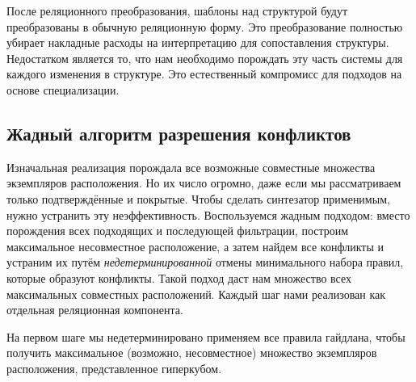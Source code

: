 После реляционного преобразования, шаблоны над структурой будут преобразованы в обычную реляционную форму. Это преобразование
полностью убирает накладные расходы на интерпретацию для сопоставления структуры. Недостатком является то, что нам необходимо
порождать эту часть системы для каждого изменения в структуре. Это естественный компромисс для подходов на основе специализации.


\subsection{Жадный алгоритм разрешения конфликтов }

Изначальная реализация порождала все возможные совместные множества экземпляров расположения.
Но их число огромно, даже если мы рассматриваем только подтверждённые и покрытые.
Чтобы сделать синтезатор применимым, нужно устранить эту неэффективность. Воспользуемся жадным подходом:
вместо порождения всех подходящих и последующей фильтрации, построим максимальное несовместное расположение, а затем найдем
все конфликты и устраним их путём \emph{недетерминированной} отмены минимального набора правил, которые образуют конфликты.
Такой подход даст нам множество всех максимальных совместных расположений.
Каждый шаг   нами реализован как отдельная реляционная компонента.
%

На первом шаге мы недетерминировано применяем все правила гайдлана, чтобы получить максимальное (возможно, несовместное)  множество экземпляров расположения, представленное гиперкубом.

